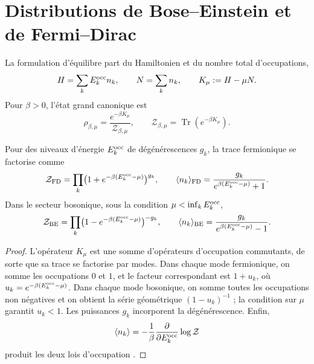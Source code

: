 \section{Distributions de Bose--Einstein et de Fermi--Dirac}
\label{v:rec:ocupacion:section:02}

La formulation d’équilibre part du Hamiltonien et du nombre total
d’occupations,
\begin{equation}
 H=\sum_kE_k^{\rm occ} n_k,
 \qquad
 N=\sum_k n_k,
 \qquad
 K_\mu:=H-\mu N.
 \label{v:rec:eq:hamiltoniano-gran-canonico-rev3}
\end{equation}
Pour \(\beta>0\), l’état grand canonique est
\begin{equation}
 \rho_{\beta,\mu}
 =\frac{e^{-\beta K_\mu}}{\mathcal Z_{\beta,\mu}},
 \qquad
 \mathcal Z_{\beta,\mu}
 =\operatorname{Tr}(e^{-\beta K_\mu}).
 \label{v:rec:eq:estado-gran-canonico-rev3}
\end{equation}

\begin{theorem}
\label{v:rec:thm:factorizacion-gran-canonica-rev3}
Pour des niveaux d’énergie \(E_k^{\rm occ}\) de dégénérescences \(g_k\), la
trace fermionique se factorise comme
\begin{equation}
 \mathcal Z_{\rm FD}
 =\prod_k\bigl(1+e^{-\beta(E_k^{\rm occ}-\mu)}\bigr)^{g_k},
 \qquad
 \langle n_k\rangle_{\rm FD}
 =\frac{g_k}{e^{\beta(E_k^{\rm occ}-\mu)}+1}.
 \label{v:rec:eq:factorizacion-fd-rev3}
\end{equation}
Dans le secteur bosonique, sous la condition
\(\mu<\inf_kE_k^{\rm occ}\),
\begin{equation}
 \mathcal Z_{\rm BE}
 =\prod_k\bigl(1-e^{-\beta(E_k^{\rm occ}-\mu)}\bigr)^{-g_k},
 \qquad
 \langle n_k\rangle_{\rm BE}
 =\frac{g_k}{e^{\beta(E_k^{\rm occ}-\mu)}-1}.
 \label{v:rec:eq:factorizacion-be-rev3}
\end{equation}
\end{theorem}

\begin{proof}
L’opérateur \(K_\mu\) est une somme d’opérateurs d’occupation commutants, de
sorte que sa trace se factorise par modes. Dans chaque mode fermionique, on somme les
occupations \(0\) et \(1\), et le facteur correspondant est
\(1+u_k\), où
\(u_k=e^{-\beta(E_k^{\rm occ}-\mu)}\). Dans chaque mode bosonique, on somme toutes
les occupations non négatives et on obtient la série géométrique
\((1-u_k)^{-1}\) ; la condition sur \(\mu\) garantit \(u_k<1\). Les
puissances \(g_k\) incorporent la dégénérescence. Enfin,
\[
 \langle n_k\rangle
 =-\frac1\beta\frac{\partial}{\partial E_k^{\rm occ}}
   \log\mathcal Z
\]
produit les deux lois d’occupation
\cite{Bose1924,Einstein1924,Fermi1926,Dirac1926,Pathria2011}.
\end{proof}
